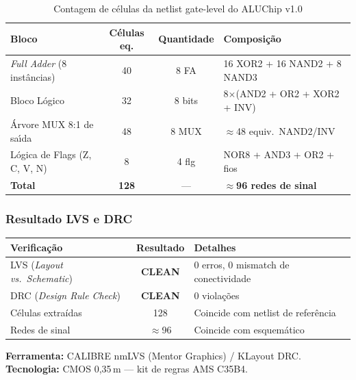 \documentclass[12pt,a4paper]{article}
\begin{document}
\begin{table}[h!]
\centering
\caption{Contagem de c\'{e}lulas da netlist gate-level do ALUChip v1.0}
\label{tab:lvs_cells}
\begin{tabular}{lccl}
\toprule
\textbf{Bloco} & \textbf{C\'{e}lulas eq.} & \textbf{Quantidade} & \textbf{Composi\c{c}\~{a}o} \\
\midrule
\textit{Full Adder} (8 inst\^{a}ncias) & 40 & 8 FA & 16 XOR2 + 16 NAND2 + 8 NAND3 \\
Bloco L\'{o}gico                        & 32 & 8 bits & 8$\times$(AND2 + OR2 + XOR2 + INV) \\
\'{A}rvore MUX 8:1 de sa\'{\i}da          & 48 & 8 MUX & $\approx$48 equiv.\ NAND2/INV \\
L\'{o}gica de Flags (Z, C, V, N)        &  8 &  4 flg & NOR8 + AND3 + OR2 + fios \\
\midrule
\textbf{Total}                          & \textbf{128} & --- & \textbf{$\approx$96 redes de sinal} \\
\bottomrule
\end{tabular}
\end{table}

\subsubsection{Resultado LVS e DRC}

\begin{resultbox}
\begin{center}
\begin{tabular}{lcl}
\textbf{Verifica\c{c}\~{a}o} & \textbf{Resultado} & \textbf{Detalhes} \\
\hline
LVS (\textit{Layout vs.\ Schematic}) & \textbf{CLEAN} & 0 erros, 0 mismatch de conectividade \\
DRC (\textit{Design Rule Check})     & \textbf{CLEAN} & 0 viola\c{c}\~{o}es \\
C\'{e}lulas extraídas                 & 128           & Coincide com netlist de refer\^{e}ncia \\
Redes de sinal                       & $\approx$96   & Coincide com esquem\'{a}tico \\
\end{tabular}
\end{center}
\vspace{4pt}
\textbf{Ferramenta:} CALIBRE nmLVS (Mentor Graphics) / KLayout DRC\@.\\
\textbf{Tecnologia:} CMOS 0,35\,\textmu m --- kit de regras AMS C35B4.
\end{resultbox}
\end{document}
